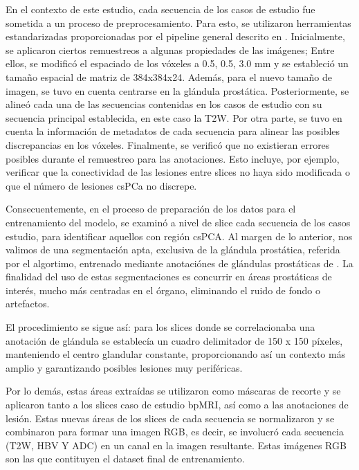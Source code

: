 En el contexto de este estudio, cada secuencia de los casos de estudio fue sometida a un proceso de preprocesamiento. Para esto, se utilizaron herramientas estandarizadas proporcionadas por el pipeline general descrito en . Inicialmente, se aplicaron ciertos remuestreos a algunas propiedades de las imágenes; Entre ellos, se modificó el espaciado de los vóxeles a 0.5, 0.5, 3.0 mm y se estableció un tamaño espacial de matriz de 384x384x24. Además, para el nuevo tamaño de imagen, se tuvo en cuenta  centrarse en la glándula prostática. Posteriormente, se alineó cada una de las secuencias contenidas en los casos de estudio con su secuencia principal establecida, en este caso la T2W.  Por otra parte, se tuvo en cuenta la información de metadatos de cada secuencia para alinear las posibles discrepancias en los vóxeles. Finalmente, se verificó que no existieran errores posibles durante el remuestreo para las anotaciones. Esto incluye, por ejemplo, verificar que la conectividad de las lesiones entre slices no haya sido modificada o que el número de lesiones csPCa no discrepe.

Consecuentemente, en el proceso de preparación de los datos para el entrenamiento del modelo, se examinó a nivel de slice cada secuencia de los casos estudio, para identificar aquellos con región csPCA. Al margen de lo anterior, nos valimos de una segmentación apta, exclusiva de la glándula prostática, referida por el algortimo, entrenado mediante anotaciónes de glándulas prostáticas de . La finalidad del uso de estas segmentaciones es concurrir en áreas prostáticas de interés, mucho más centradas en el órgano, eliminando el ruido de fondo o artefactos.

El procedimiento se sigue así: para los slices donde se correlacionaba una anotación de glándula se establecía un cuadro delimitador de 150 x 150 píxeles, manteniendo el centro glandular constante, proporcionando así un contexto más amplio y garantizando posibles lesiones muy periféricas. 

Por lo demás, estas áreas extraídas se utilizaron como máscaras de recorte y se aplicaron tanto a los slices caso de estudio bpMRI, así como a las anotaciones de lesión. Estas nuevas áreas de los slices de cada secuencia se normalizaron y se combinaron para formar una imagen RGB, es decir, se involucró cada secuencia (T2W, HBV Y ADC) en un canal en la imagen resultante. Estas imágenes RGB son las que contituyen el dataset final de entrenamiento.

